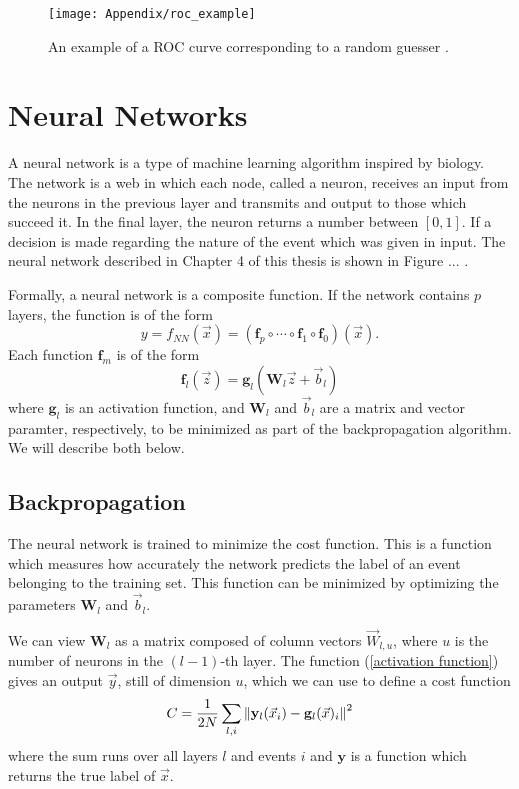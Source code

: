 \documentclass[10pt,a4paper]{book}
\begin{document}
\begin{figure}
\centering
\texttt{[image: Appendix/roc\_example]}
\caption{An example of a ROC curve corresponding to a random guesser \cite{burkov2019hundred}.}
\label{roc example}
\end{figure}

\section{Neural Networks}
A neural network is a type of machine learning algorithm inspired by biology. The network is a web in which each node, called a neuron, receives an input from the neurons in the previous layer and transmits and output to those which succeed it. In the final layer, the neuron returns a number between $[0,1]$. If  a decision is made regarding the nature of the event which was given in input.  The neural network described in Chapter 4 of this thesis is shown in Figure ... .

Formally, a neural network is a composite function. If the network contains $p$ layers, the function is of the form
\begin{equation}
y = f_{NN}(\vec{x}) = \left( \mathbf{f}_p \circ \cdots \circ \mathbf{f}_1 \circ \mathbf{f}_0\right) (\vec{x}).
\label{NN equation}
\end{equation}
Each function $\mathbf{f}_m$ is of the form
\begin{equation}
\mathbf{f}_l (\vec{z}) = \mathbf{g}_l \left(\mathbf{W}_l\vec{z} + \vec{b}_l \right)
\label{activation function}
\end{equation}
where $\mathbf{g}_l$ is an activation function, and $\mathbf{W}_l$ and $\vec{b}_l$ are a matrix and vector paramter, respectively, to be minimized as part of the backpropagation algorithm. We will describe both below. 

\subsection{Backpropagation}
The neural network is trained to minimize the cost function. This is a function which measures how accurately the network predicts the label of an event belonging to the training set. This function can be minimized by optimizing the parameters $\mathbf{W}_l$ and $\vec{b}_l$. 

We can view $\mathbf{W}_l$ as a matrix composed of column vectors $\vec{W}_{l,u}$, where $u$ is the number of neurons in the $(l-1)$-th layer. The function (\ref{activation function}) gives an output $\vec{y}$, still of dimension $u$, which we can use to define a cost function
\begin{equation}
C = \frac{1}{2N} \sum_{l, i} \norm{\mathbf{y}_l(\vec{x}_i) - \mathbf{g}_l(\vec{x})_i}^2
\label{cost function}
\end{equation}
where the sum runs over all layers $l$ and events $i$ and $\mathbf{y}$ is a function which returns the true label of $\vec{x}$.
\end{document}
